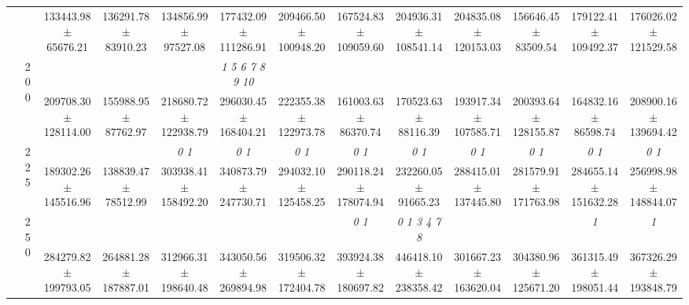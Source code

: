 \begin{table}[h]
{\begin{tabular}{
        ccccccccccccc}
 & & \cellcolor[HTML]{EFEFEF} 133443.98 $\pm$ 65676.21& \cellcolor[HTML]{EFEFEF} 136291.78 $\pm$ 83910.23& \cellcolor[HTML]{EFEFEF} 134856.99 $\pm$ 97527.08& \cellcolor[HTML]{EFEFEF} 177432.09 $\pm$ 111286.91& \cellcolor[HTML]{EFEFEF} 209466.50 $\pm$ 100948.20& \cellcolor[HTML]{EFEFEF} 167524.83 $\pm$ 109059.60& \cellcolor[HTML]{EFEFEF} 204936.31 $\pm$ 108541.14& \cellcolor[HTML]{EFEFEF} 204835.08 $\pm$ 120153.03& \cellcolor[HTML]{EFEFEF} 156646.45 $\pm$ 83509.54& \cellcolor[HTML]{EFEFEF} 179122.41 $\pm$ 109492.37& \cellcolor[HTML]{EFEFEF} 176026.02 $\pm$ 121529.58 \\ 
 & \multirow{2}{*}{200}& & & & \textit{  1  5  6  7  8  9 10 }& & & & & & &  \\ 
 & & 209708.30 $\pm$ 128114.00& 155988.95 $\pm$ 87762.97& 218680.72 $\pm$ 122938.79& 296030.45 $\pm$ 168404.21& 222355.38 $\pm$ 122973.78& 161003.63 $\pm$ 86370.74& 170523.63 $\pm$ 88116.39& 193917.34 $\pm$ 107585.71& 200393.64 $\pm$ 128155.87& 164832.16 $\pm$ 86598.74& 208900.16 $\pm$ 139694.42 \\ 
 & \multirow{2}{*}{225}& \cellcolor[HTML]{EFEFEF} & \cellcolor[HTML]{EFEFEF} & \cellcolor[HTML]{EFEFEF} \textit{ 0 1 }& \cellcolor[HTML]{EFEFEF} \textit{ 0 1 }& \cellcolor[HTML]{EFEFEF} \textit{ 0 1 }& \cellcolor[HTML]{EFEFEF} \textit{ 0 1 }& \cellcolor[HTML]{EFEFEF} \textit{ 0 1 }& \cellcolor[HTML]{EFEFEF} \textit{ 0 1 }& \cellcolor[HTML]{EFEFEF} \textit{ 0 1 }& \cellcolor[HTML]{EFEFEF} \textit{ 0 1 }& \cellcolor[HTML]{EFEFEF} \textit{ 0 1 } \\ 
 & & \cellcolor[HTML]{EFEFEF} 189302.26 $\pm$ 145516.96& \cellcolor[HTML]{EFEFEF} 138839.47 $\pm$ 78512.99& \cellcolor[HTML]{EFEFEF} 303938.41 $\pm$ 158492.20& \cellcolor[HTML]{EFEFEF} 340873.79 $\pm$ 247730.71& \cellcolor[HTML]{EFEFEF} 294032.10 $\pm$ 125458.25& \cellcolor[HTML]{EFEFEF} 290118.24 $\pm$ 178074.94& \cellcolor[HTML]{EFEFEF} 232260.05 $\pm$ 91665.23& \cellcolor[HTML]{EFEFEF} 288415.01 $\pm$ 137445.80& \cellcolor[HTML]{EFEFEF} 281579.91 $\pm$ 171763.98& \cellcolor[HTML]{EFEFEF} 284655.14 $\pm$ 151632.28& \cellcolor[HTML]{EFEFEF} 256998.98 $\pm$ 148844.07 \\ 
 & \multirow{2}{*}{250}& & & & & & \textit{ 0 1 }& \textit{ 0 1 3 4 7 8 }& & & \textit{ 1 }& \textit{ 1 } \\ 
 & & 284279.82 $\pm$ 199793.05& 264881.28 $\pm$ 187887.01& 312966.31 $\pm$ 198640.48& 343050.56 $\pm$ 269894.98& 319506.32 $\pm$ 172404.78& 393924.38 $\pm$ 180697.82& 446418.10 $\pm$ 238358.42& 301667.23 $\pm$ 163620.04& 304380.96 $\pm$ 125671.20& 361315.49 $\pm$ 198051.44& 367326.29 $\pm$ 193848.79 \\ 

\end{tabular}}
\end{table}
